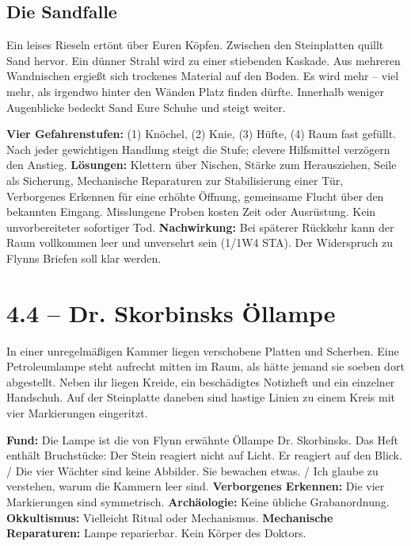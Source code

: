 \subsection{Die Sandfalle}
\begin{vorlesetextalle}
Ein leises Rieseln ertönt über Euren Köpfen. Zwischen den Steinplatten quillt Sand hervor. Ein dünner Strahl wird zu einer stiebenden Kaskade. Aus mehreren Wandnischen ergie\ss{}t sich trockenes Material auf den Boden. Es wird mehr -- viel mehr, als irgendwo hinter den Wänden Platz finden dürfte. Innerhalb weniger Augenblicke bedeckt Sand Eure Schuhe und steigt weiter.
\end{vorlesetextalle}
\begin{meisterinfo}
\textbf{Vier Gefahrenstufen:} (1) Knöchel, (2) Knie, (3) Hüfte, (4) Raum fast gefüllt. Nach jeder gewichtigen Handlung steigt die Stufe; clevere Hilfsmittel verzögern den Anstieg. \textbf{Lösungen:} Klettern über Nischen, Stärke zum Herausziehen, Seile als Sicherung, Mechanische Reparaturen zur Stabilisierung einer Tür, Verborgenes Erkennen für eine erhöhte Öffnung, gemeinsame Flucht über den bekannten Eingang. Misslungene Proben kosten Zeit oder Ausrüstung. Kein unvorbereiteter sofortiger Tod. \textbf{Nachwirkung:} Bei späterer Rückkehr kann der Raum vollkommen leer und unversehrt sein (1/1W4 STA). Der Widerspruch zu Flynns Briefen soll klar werden.
\end{meisterinfo}
\section{4.4 -- Dr. Skorbinsks Öllampe}
\begin{vorlesetextalle}
In einer unregelmä\ss{}igen Kammer liegen verschobene Platten und Scherben. Eine Petroleumlampe steht aufrecht mitten im Raum, als hätte jemand sie soeben dort abgestellt. Neben ihr liegen Kreide, ein beschädigtes Notizheft und ein einzelner Handschuh. Auf der Steinplatte daneben sind hastige Linien zu einem Kreis mit vier Markierungen eingeritzt.
\end{vorlesetextalle}
\begin{meisterinfo}
\textbf{Fund:} Die Lampe ist die von Flynn erwähnte Öllampe Dr. Skorbinsks. Das Heft enthält Bruchstücke: \glqq{}Der Stein reagiert nicht auf Licht. Er reagiert auf den Blick.\grqq{} / \glqq{}Die vier Wächter sind keine Abbilder. Sie bewachen etwas.\grqq{} / \glqq{}Ich glaube zu verstehen, warum die Kammern leer sind.\grqq{} \textbf{Verborgenes Erkennen:} Die vier Markierungen sind symmetrisch. \textbf{Archäologie:} Keine übliche Grabanordnung. \textbf{Okkultismus:} Vielleicht Ritual oder Mechanismus. \textbf{Mechanische Reparaturen:} Lampe reparierbar. Kein Körper des Doktors.
\end{meisterinfo}
